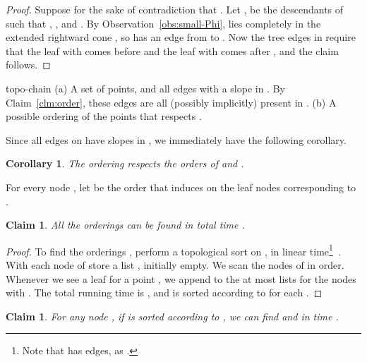 \documentclass[11pt]{paper}
\newtheorem {cor}[theorem] {Corollary}
\newtheorem {claim}[theorem] {Claim}
\begin{document}
\begin {proof}\label{clm:respecting_order}
Suppose for the sake of contradiction that .
Let ,  be the descendants of  such that
, , 
and .
By Observation~\ref{obs:small-Phi},  lies completely
in the extended rightward cone , so
 has an edge from  to .
Now the tree edges in 
require that the leaf with 
comes before  and the leaf with  comes after
, and the claim follows.
\end{proof}

 {topo-chain}
{(a) A set of points, and all edges with a slope in .
     By Claim~\ref {clm:order}, these edges are all (possibly implicitly)
     present in .
 (b) A possible ordering  of the points that respects .
}

Since all edges on  have slopes in , we immediately
have the following corollary.

\begin{cor}
The ordering  respects the orders of  and .

\end{cor}

For every node , let  be the order 
that  induces on the leaf nodes corresponding to . 

\begin{claim}\label{clm:topo_sort}
All the orderings  can be found in total time .
\end{claim}

\begin {proof}
To find the orderings , perform a topological sort on
, in linear time\footnote{Note that
 has  edges, as
.}~\cite[Chapter~22.4]{CormenLeRiSt09}.
With each node  of  store a list , initially empty.
We scan the nodes of  in order. Whenever we see 
a leaf for a point , we append  to the
at most  
lists  for the nodes  with .
The total running time is 
, and 
is sorted according to  for each .
\end{proof}

\begin{claim}\label{clm:findUCLC}
For any node , if  is sorted according to ,
we can find  and
 in
time .
\end{claim}
\end{document}
